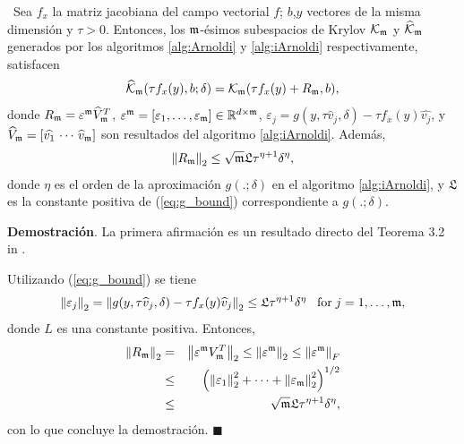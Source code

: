 \begin{theorem} \label{theorem:krilobapproxequality} \cite{naranjo2023jacobian}~Sea $f_x$ la matriz jacobiana del campo vectorial $f$; $b$,$y$ vectores de la misma dimensión y $\tau>0$. Entonces, los $\mathfrak{m}$-ésimos subespacios de Krylov $\mathcal{K}_{\mathfrak{m}}$ y $\widehat{\mathcal{K}}_{\mathfrak{m}}$ generados por los algoritmos \ref{alg:Arnoldi} y \ref{alg:iArnoldi} respectivamente, satisfacen 
	\[ \widehat{\mathcal{K}}_{\mathfrak{m}}(\tau f_x(y),b;\delta) = \mathcal{K}_{\mathfrak{m}}(\tau f_x(y)+R_{\mathfrak{m}},b), \]
	donde $R_{\mathfrak{m}} =  \varepsilon^{\mathfrak{m}}\widehat{V}^T_{\mathfrak{m}}$,  
	$\varepsilon^{\mathfrak{m}} = [\varepsilon_1,\dots,\varepsilon_{\mathfrak{m}}] \in \mathbb{R}^{d\times \mathfrak{m}}$, $\varepsilon_j = g(y,\tau\widehat{v}_j,\delta)- \tau f_x(y)\widehat{v_j}$, y $\widehat{V}_{\mathfrak{m}}=[\widehat{v_1}\,\cdots \,\widehat{v}_{\mathfrak{m}}]$ son resultados del algoritmo \ref{alg:iArnoldi}. Además, 
	\[ \left\lVert R_{\mathfrak{m}} \right\rVert_2\leq \sqrt{\mathfrak{m}}\mathfrak{L} \tau^{\eta+1}\delta^{\eta}, \]
	donde $\eta$ es el orden de la aproximación $g(.;\delta)$ en el algoritmo \ref{alg:iArnoldi}, y $\mathfrak{L}$ es la constante positiva de (\ref{eq:g_bound}) correspondiente a $g(.;\delta)$.
\end{theorem}
\textbf{Demostración}. La primera afirmación es un resultado directo del Teorema 3.2 in \cite{brown1987local}.

Utilizando  (\ref{eq:g_bound}) se tiene
\[ \left\lVert \varepsilon_j \right\rVert_2=\left\lVert g(y,\tau\widehat{v}_j,\delta)-\tau f_x(y)\widehat{v}_j \right\rVert_2 \leq  \mathfrak{L} \tau^{\eta+1}\delta^{\eta}\;\;\;\text{for}\;j=1,\dots,\mathfrak{m}, \]
donde $L$ es una constante positiva. Entonces, 
\begin{eqnarray*}
	\left\lVert R_{\mathfrak{m}} \right\rVert_2 & = & \left\lVert \varepsilon^{\mathfrak{m}} V_{\mathfrak{m}}^T \right\rVert_2\leq\left\lVert \varepsilon^{\mathfrak{m}} \right\rVert_2\leq \left\lVert \varepsilon^{\mathfrak{m}} \right\rVert_F \\
	& \leq & \left( \left\lVert \varepsilon_1 \right\rVert_2^2 + \cdots + \left\lVert \varepsilon_{\mathfrak{m}} \right\rVert_2^2 \right)^{1/2} \\
	& \leq & \sqrt{\mathfrak{m}}\mathfrak{L} \tau^{\eta+1}\delta^{\eta},
\end{eqnarray*}
con lo que concluye la demostración. $\blacksquare$\\

